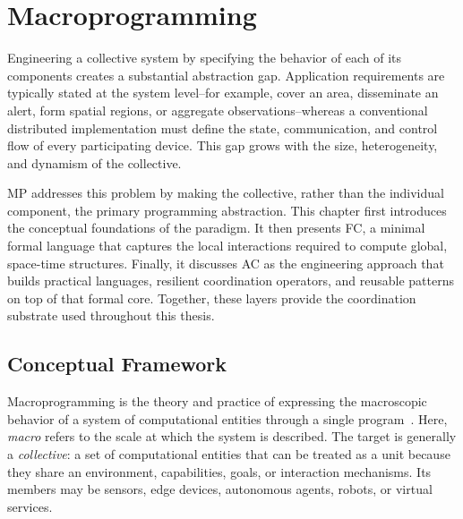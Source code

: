 
\chapter{Macroprogramming}
\label{chap:macroprogramming}
\minitoc

Engineering a collective system by specifying the behavior of each of its
 components creates a substantial abstraction gap.
% 
Application requirements are typically stated at the system level--for example, 
 cover an area, disseminate an alert, form spatial regions, or aggregate observations--whereas 
 a conventional distributed implementation must define the state, communication,
 and control flow of every participating device. 
% 
This gap grows with the size, heterogeneity, and dynamism of the collective.

\gls{MP} addresses this problem by making the collective, 
 rather than the individual component, the primary programming abstraction. 
%
This chapter first introduces the conceptual foundations of the paradigm. 
%
It then presents \gls{FC}, 
 a minimal formal language that captures the local interactions required to compute global, 
 space-time structures. 
% 
Finally, 
 it discusses \gls{AC} as the engineering approach that builds practical languages,
 resilient coordination operators, and reusable patterns on top of that formal core. 
% 
Together, 
 these layers provide the coordination substrate used throughout this thesis. 

\section{Conceptual Framework}
\label{sec:macroprogramming-conceptual-framework}

Macroprogramming is the theory and practice of expressing the 
 macroscopic behavior of a system of computational entities 
 through a single program~\cite{DBLP:journals/csur/Casadei23}.
% 
Here, 
 \emph{macro} refers to the scale at which the system is described.
%
The target is generally a \emph{collective}: 
 a set of computational entities that can be treated as a unit because they share 
 an environment, capabilities, goals, or interaction mechanisms. 
% 
Its members may be sensors, edge devices, autonomous agents, robots, or virtual services.

